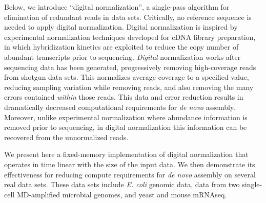 \documentclass{pnastwo}
\begin{document}
\begin{article}
Below, we introduce ``digital normalization'', a single-pass algorithm
for elimination of redundant reads in data sets.  Critically, no
reference sequence is needed to apply digital normalization.  Digital
normalization is inspired by experimental normalization techniques
developed for cDNA library preparation, in which hybridization
kinetics are exploited to reduce the copy number of abundant
transcripts prior to sequencing\cite{pubmed8889548,pubmed7937745}.
{\em Digital} normalization works after sequencing data has been
generated, progressively removing high-coverage reads from shotgun
data sets.  This normalizes average coverage to a specified value,
reducing sampling variation while removing reads, and also removing
the many errors contained {\em within} those reads.  This data and
error reduction results in dramatically decreased computational
requirements for {\em de novo} assembly.  Moreover, unlike experimental
normalization where abundance information is removed prior to sequencing,
in digital normalization this information can be recovered from the
unnormalized reads.




We present here a fixed-memory implementation of digital normalization
that operates in time linear with the size of the input data.  We then
demonstrate its effectiveness for reducing compute requirements for
{\em de novo} assembly on several real data sets.  These data sets
include {\em E. coli} genomic data, data from two single-cell
MD-amplified microbial genomes, and yeast and mouse mRNAseq.


\end{article}
\end{document}
